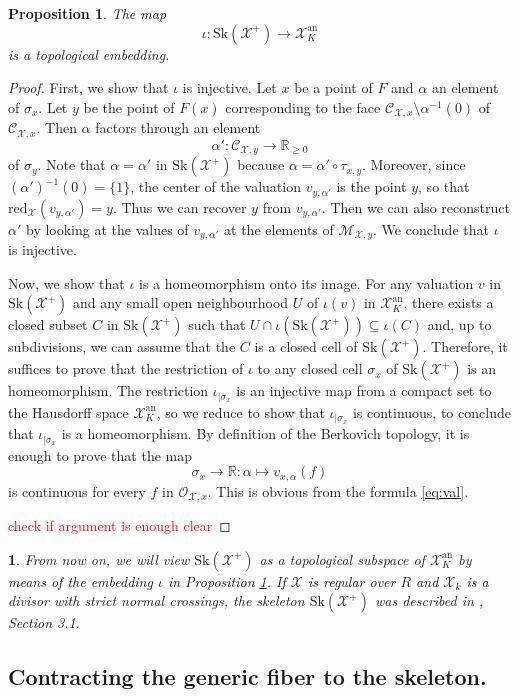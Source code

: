 \documentclass{amsart}%
\numberwithin{equation}{subsection}
\theoremstyle{plain2}
\newtheorem{prop}[equation]{Proposition}
\theoremstyle{definition2}
\theoremstyle{stepstyle}
\theoremstyle{point}
\theoremstyle{subpoint}
\newtheorem{subpoint}[equation]{}%
\newcommand{\spa}[1]{\begin{subpoint}#1\end{subpoint}}           %
\newcommand{\R}{\ensuremath{\mathbb{R}}}
\newcommand{\cX}{\ensuremath{\mathscr{X}}}
\renewcommand{\R}{\ensuremath{\mathbb{R}}}
\newcommand{\redu}{\mathrm{red}}
\newcommand{\an}{\mathrm{an}}
\newcommand{\Sk}{\mathrm{Sk}}
\begin{document}
\begin{prop}\label{prop-embed}
The map $$\iota:\Sk(\cX^+)\to\cX_K^\an$$  is a
topological embedding.
\end{prop}
\begin{proof}
First, we show that $\iota$ is injective. Let $x$ be a point of $F$ and $\alpha$ an element of $\sigma_x$. Let $y$ be the point of $F(x)$ corresponding to the face $\mathcal{C}_{\cX,x}\setminus
\alpha^{-1}(0)$ of $\mathcal{C}_{\cX,x}$. Then $\alpha$ factors through an element
$$\alpha':\mathcal{C}_{\cX,y}\to \R_{\geqslant 0}$$ of $\sigma_y$.  Note that $\alpha=\alpha'$ in $\Sk(\cX^+)$ because $\alpha=\alpha'\circ \tau_{x,y}$.
Moreover, since $(\alpha')^{-1}(0)=\{1\}$, the center of the valuation $v_{y,\alpha'}$ is the point $y$, so that $\redu_{\cX}(v_{y,\alpha'})=y$. Thus we can recover $y$ from $v_{y,\alpha'}$. Then we can also reconstruct $\alpha'$ by looking at the values of $v_{y,\alpha'}$ at the elements of $\mathcal{M}_{\cX,y}$. We conclude that $\iota$ is injective.

Now, we show that $\iota$ is a homeomorphism onto its image. For any valuation $v$ in $\Sk(\cX^+)$ and any small open neighbourhood $U$ of $\iota(v)$ in $\cX_K^\an$, there exists a closed subset $C$ in $\Sk(\cX^+)$ such that $U \cap \iota(\Sk(\cX^+))\subseteq \iota(C)$ and, up to subdivisions, we can assume that the $C$ is a closed cell of $\Sk(\cX^+)$. Therefore, it suffices to prove that the restriction of $\iota$ to any closed cell $\sigma_x$ of $\Sk(\cX^+)$ is an homeomorphism. The restriction $\iota_{|\sigma_x}$ is an injective map from a compact set to the Hausdorff space $\cX_K^\an$, so we reduce to show that $\iota_{|\sigma_x}$ is continuous, to conclude that $\iota_{|\sigma_x}$ is a homeomorphism. By definition of the Berkovich topology, it is enough to prove that the map $$\sigma_x\to \R:\alpha\mapsto v_{x,\alpha}(f)$$ is continuous for every $f$ in $\mathcal{O}_{\cX,x}$. This is obvious from the formula \eqref{eq:val}. 

\textcolor{red}{check if argument is enough clear}
\end{proof}

\spa{From now on, we will view $\Sk(\cX^+)$ as a topological subspace of $\cX_K^{\an}$ by means of the embedding $\iota$ in Proposition \ref{prop-embed}. If $\cX$ is regular over $R$ and $\cX_k$ is a divisor with strict normal crossings, the skeleton $\Sk(\cX^+)$ was described in \cite{MustataNicaise}, Section 3.1.}

\subsection{Contracting the generic fiber to the skeleton.}
\end{document}
